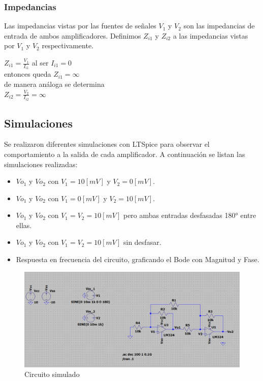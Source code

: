 \subsubsection{Impedancias}
Las impedancias vistas por las fuentes de señales $V_1$ y $V_2$ son las impedancias de entrada de ambos amplificadores. Definimos $Z_{i1}$ y $Z_{i2}$ a las impedancias vistas por $V_1$ y $V_2$ respectivamente.
\begin{center}
	$Z_{i1}= \frac{V_1}{I_{i1}}$ al ser $I_{i1}=0$ \\
	entonces queda $Z_{i1}= \infty$\\
	de manera análoga se determina\\
	$Z_{i2}=\frac{V_2}{I_{i2}}=\infty$
\end{center}
\subsection{Simulaciones}
Se realizaron diferentes simulaciones con LTSpice para observar el comportamiento a la salida de cada amplificador. A continuación se listan las simulaciones realizadas:
\begin{itemize}
	\item $Vo_1$ y $Vo_2$ con $V_1=10[mV]$ y $V_2=0[mV]$.
	\item $Vo_1$ y $Vo_2$ con $V_1=0[mV]$ y $V_2=10[mV]$.
	\item $Vo_1$ y $Vo_2$ con $V_1 = V_2 = 10[mV]$ pero ambas entradas desfasadas 180° entre ellas.
	\item $Vo_1$ y $Vo_2$ con $V_1=V_2=10[mV]$ sin desfasar.
	\item Respuesta en frecuencia del circuito, graficando el Bode con Magnitud y Fase.
\end{itemize}
\begin{figure}[H]
	\centering
	\includegraphics[width=1\textwidth]{figuras/circuito1.png}
	\caption{Circuito simulado}
\end{figure}
